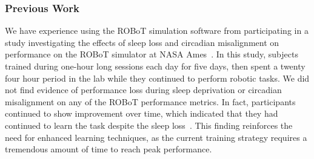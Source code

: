\subsubsection{Previous Work}
We have experience using the ROBoT simulation software from participating in a study investigating the effects of sleep loss and circadian misalignment on performance on the ROBoT simulator at NASA Ames~\citep{robotreport}.
In this study, subjects trained during one-hour long sessions each day for five days, then spent a twenty four hour period in the lab while they continued to perform robotic tasks.
We did not find evidence of performance loss during sleep deprivation or circadian misalignment on any of the ROBoT performance metrics.
In fact, participants continued to show improvement over time, which indicated that they had continued to learn the task despite the sleep loss~\citep{robotreport}.
This finding reinforces the need for enhanced learning techniques, as the current training strategy requires a tremendous amount of time to reach peak performance.





